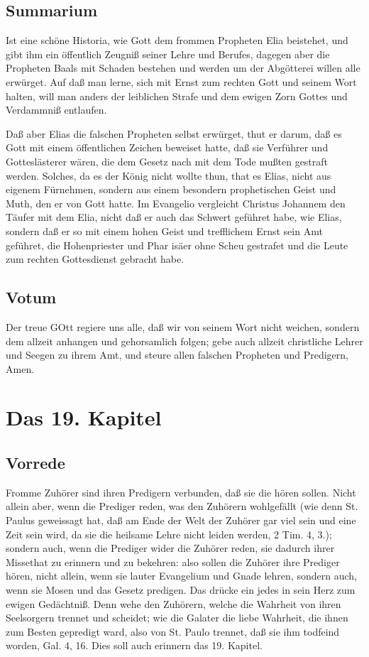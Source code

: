 \section{Summarium}

Ist eine schöne Historia, wie Gott dem frommen Propheten Elia beistehet, und gibt ihm ein öffentlich Zeugniß seiner Lehre und Berufes, dagegen aber die Propheten Baals mit Schaden bestehen und werden um der Abgötterei willen alle erwürget. Auf daß man lerne, sich mit Ernst zum rechten Gott und seinem Wort halten, will man anders der leiblichen Strafe und dem ewigen Zorn Gottes und Verdammniß entlaufen.

Daß aber Elias die falschen Propheten selbst erwürget, thut er darum, daß es Gott mit einem öffentlichen Zeichen beweiset hatte, daß sie Verführer und Gotteslästerer wären, die dem Gesetz nach mit dem Tode mußten gestraft werden. Solches, da es der König nicht wollte thun, that es Elias, nicht aus eigenem Fürnehmen, sondern aus einem besondern prophetischen Geist und Muth, den er von Gott hatte. Im Evangelio vergleicht Christus Johannem den Täufer mit dem Elia, nicht daß er auch das Schwert geführet habe, wie Elias, sondern daß er so mit einem hohen Geist und trefflichem Ernst sein Amt geführet, die Hohenpriester und Phar isäer ohne Scheu gestrafet und die Leute zum rechten Gottesdienst gebracht habe.

\section{Votum}

Der treue GOtt regiere uns alle, daß wir von seinem Wort nicht weichen, sondern dem allzeit anhangen und gehorsamlich folgen; gebe auch allzeit christliche Lehrer und Seegen zu ihrem Amt, und steure allen falschen Propheten und Predigern, Amen.

\chapter{Das 19. Kapitel}

\section{Vorrede}

Fromme Zuhörer sind ihren Predigern verbunden, daß sie die hören sollen. Nicht allein aber, wenn die Prediger reden, was den Zuhörern wohlgefällt (wie denn St. Paulus geweissagt hat, daß am Ende der Welt der Zuhörer gar viel sein und eine Zeit sein wird, da sie die heilsame Lehre nicht leiden werden, 2 Tim. 4, 3.); sondern auch, wenn die Prediger wider die Zuhörer reden, sie dadurch ihrer Missethat zu erinnern und zu bekehren: also sollen die Zuhörer ihre Prediger hören, nicht allein, wenn sie lauter Evangelium und Gnade lehren, sondern auch, wenn sie Mosen und das Gesetz predigen. Das drücke ein jedes in sein Herz zum ewigen Gedächtniß. Denn wehe den Zuhörern, welche die Wahrheit von ihren Seelsorgern trennet und scheidet; wie die Galater die liebe Wahrheit, die ihnen zum Besten gepredigt ward, also von St. Paulo trennet, daß sie ihm todfeind worden, Gal. 4, 16. Dies soll auch erinnern das 19. Kapitel.

